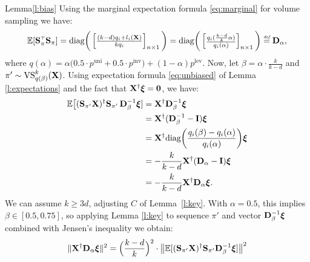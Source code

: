 \documentclass[12pt]{sty/colt2019/colt2018-arxiv}
\begin{document}
\begin{proofof}{Lemma}{\ref{l:bias}}
Using the marginal expectation formula \eqref{eq:marginal} for
volume sampling we have:
\begin{align*}
  \E[\S_\pi^\top\S_\pi] =
  \text{diag}\bigg(\begin{bmatrix}\frac{(k-d)q_i+l_i(\X)}{kq_i}
  \end{bmatrix}_{n\times
  1}\bigg)
  =   \text{diag}\bigg(\begin{bmatrix}\frac{q_i(\frac
  {k-d}k\alpha)}{q_i(\alpha)}\end{bmatrix}_{n\times 1}\bigg)\defeq \D_\alpha,
\end{align*}
where 
  $q(\alpha)= \alpha
  \big(0.5\cdot p^{\mathrm{uni}}+0.5\cdot p^{\mathrm{inv}}\big)
  +(1\!-\!\alpha)p^{\mathrm{lev}}$. Now, let $\beta =
  \alpha\cdot\frac{k}{k-d}$ and $\pi'\sim {\mathrm{VS}}_{q(\beta)}^k(\mathbf X)$. 
Using expectation formula \eqref{eq:unbiased} of Lemma
\ref{l:expectations} and the fact that $\mathbf X^\dagger\boldsymbol\xi=\mathbf 0$, we have:
\begin{align*}
  \mathbb E\big[(\mathbf{S}_{\pi'}\mathbf X)^\dagger\mathbf{S}_{\pi'}\,\mathbf D_\beta^{-1}\boldsymbol\xi]
  &= \mathbf X^\dagger \mathbf D_{\beta}^{-1}\boldsymbol\xi \\
&=\mathbf X^\dagger(\mathbf D_{\beta}^{-1}-\mathbf I)\boldsymbol\xi\\
  &=\mathbf X^\dagger \text{diag}\bigg(\frac{q_i(\beta) -
    q_i(\alpha)}{q_i(\alpha)}\bigg)\boldsymbol\xi\\
  &=-\frac{k}{k-d}\mathbf X^\dagger(\mathbf D_{\alpha}-\mathbf I)\boldsymbol\xi\\
  &=-\frac{k}{k-d}\mathbf X^\dagger\mathbf D_\alpha\boldsymbol\xi.
\end{align*}
We can assume $k\geq 3d$, adjusting $C$ of Lemma~\ref{l:key}.
With $\alpha=0.5$, this implies $\beta\in[0.5,0.75]$, so
applying Lemma \ref{l:key} to sequence $\pi'$ and vector
$\mathbf D_\beta^{-1}\boldsymbol\xi$ combined with Jensen's inequality we obtain:
\begin{align*}
  \|\X^\dagger\D_\alpha\xib\|^2
  &=\Big(\frac{k-d}{k}\Big)^2\cdot
\big\|\E[(\S_{\pi'}\X)^\dagger\S_{\pi'}\D_\beta^{-1}\xib]\big\|^2\\ 

\end{align*}
\end{proofof}
\end{document}
